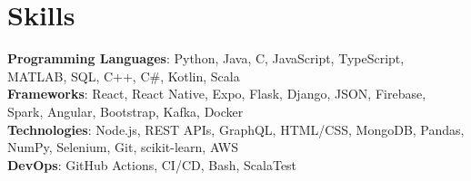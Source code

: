 \section{Skills}
    \begin{itemize}[leftmargin=0.15in, label={}]
	\small{\item{
		\textbf{Programming Languages}{: Python, Java, C, JavaScript, TypeScript, MATLAB, SQL, C++, C\#, Kotlin, Scala} \\
		\textbf{Frameworks}{: React, React Native, Expo, Flask, Django, JSON, Firebase, Spark, Angular, Bootstrap, Kafka, Docker} \\
		\textbf{Technologies}{: Node.js, REST APIs, GraphQL,  HTML/CSS, MongoDB, Pandas, NumPy, Selenium, Git, scikit-learn, AWS} \\
		\textbf{DevOps}{: GitHub Actions, CI/CD, Bash, ScalaTest} \\
	}}
    \end{itemize}
